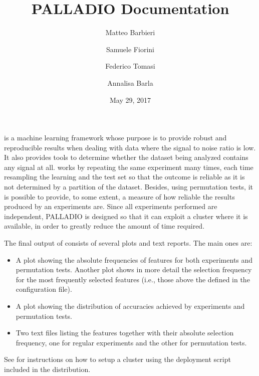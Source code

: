 \documentclass[letterpaper,10pt,english]{sphinxmanual}
\title{PALLADIO Documentation}
\date{May 29, 2017}
\author{Matteo Barbieri \and Samuele Fiorini \and Federico Tomasi \and Annalisa Barla}
\begin{document}
\maketitle
\sphinxtableofcontents
{}\label{\detokenize{index::doc}}


 is a machine learning framework whose purpose is to provide robust and reproducible results when dealing with data where the signal to noise ratio is low.
It also provides tools to determine whether the dataset being analyzed contains any signal at all.
 works by repeating the same experiment many times, each time resampling the learning and the test set so that the outcome is reliable as it is not determined by a  partition of the dataset. Besides, using permutation tests, it is possible to provide, to some extent, a measure of how reliable the results produced by an experiments are.
Since all experiments performed are independent, PALLADIO is designed so that it can exploit a cluster where it is available, in order to greatly reduce the amount of time required.

The final output of  consists of several plots and text reports. The main ones are:
\begin{itemize}
\item {} 
A plot showing the absolute frequencies of features for both  experiments and permutation tests. Another plot shows in more detail the selection frequency for the most frequently selected features (i.e., those above the  defined in the configuration file).

\item {} 
A plot showing the distribution of accuracies achieved by  experiments and permutation tests.

\item {} 
Two text files listing the features together with their absolute selection frequency, one for regular experiments and the other for permutation tests.

\end{itemize}

See {\hyperref[\detokenize{tutorial:tutorial}]{}} for instructions on how to setup a cluster using the deployment script included in the  distribution.
\end{document}

